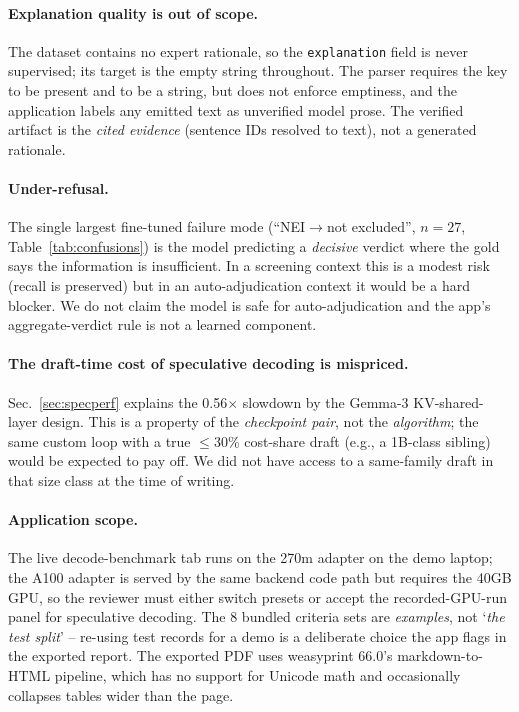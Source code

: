 \documentclass[conference]{IEEEtran}
\newcommand{\code}[1]{\texttt{\small #1}}
\begin{document}
\paragraph*{Explanation quality is out of scope.}
The dataset contains no expert rationale, so the
\code{explanation} field is never supervised; its target is the
empty string throughout. The parser requires the key to be
present and to be a string, but does not enforce emptiness, and
the application labels any emitted text as unverified model prose.
The verified artifact is the \emph{cited evidence} (sentence IDs
resolved to text), not a generated rationale.

\paragraph*{Under-refusal.}
The single largest fine-tuned failure mode
(``NEI$\to$not excluded'', $n=27$, Table~\ref{tab:confusions})
is the model predicting a \emph{decisive} verdict where the gold
says the information is insufficient. In a screening
context this is a modest risk (recall is preserved) but in an
auto-adjudication context it would be a hard blocker. We do not
claim the model is safe for auto-adjudication and the app's
aggregate-verdict rule is not a learned component.

\paragraph*{The draft-time cost of speculative decoding is
mispriced.}
Sec.~\ref{sec:specperf} explains the 0.56$\times$ slowdown by the
Gemma-3 KV-shared-layer design. This is a property of the
\emph{checkpoint pair}, not the \emph{algorithm}; the same
custom loop with a true $\leq$30\% cost-share draft
(e.g., a 1B-class sibling) would be expected to pay off. We did
not have access to a same-family draft in that size class
at the time of writing.

\paragraph*{Application scope.}
The live decode-benchmark tab runs on the 270m adapter on the
demo laptop; the A100 adapter is served by the same backend code
path but requires the 40GB GPU, so the reviewer must either
switch presets or accept the recorded-GPU-run panel for
speculative decoding. The 8 bundled criteria sets are
\emph{examples}, not `\emph{the test split}' -- re-using test
records for a demo is a deliberate choice the app flags in the
exported report. The exported PDF uses weasyprint 66.0's
markdown-to-HTML pipeline, which has no support for
Unicode math and occasionally collapses tables wider than the
page.
\end{document}
